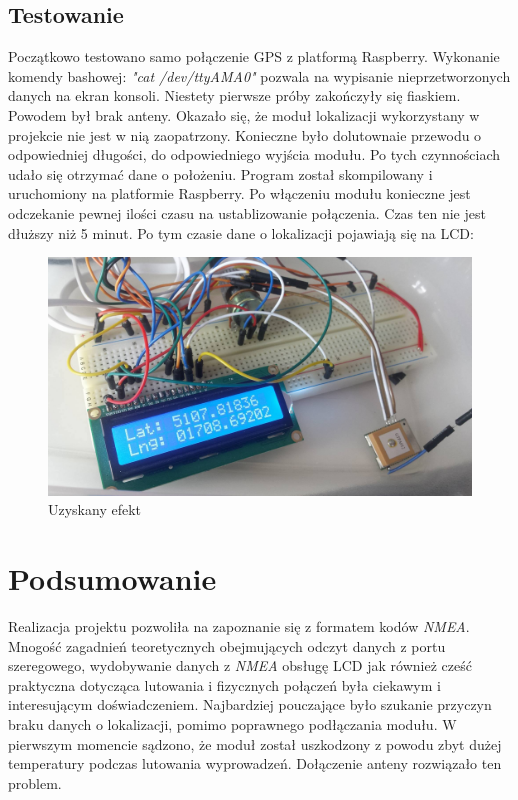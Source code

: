 \documentclass{article}
\begin{document}
	\subsection{Testowanie}	
	Początkowo testowano samo połączenie GPS z platformą Raspberry. Wykonanie komendy bashowej:
	\textit{"cat /dev/ttyAMA0"}
	pozwala na wypisanie nieprzetworzonych danych na ekran konsoli. Niestety pierwsze próby zakończyły się fiaskiem. Powodem był brak anteny. Okazało się, że moduł lokalizacji wykorzystany w projekcie nie jest w nią zaopatrzony. Konieczne było dolutownaie przewodu o odpowiedniej długości, do odpowiedniego wyjścia modułu. Po tych czynnościach udało się otrzymać dane o położeniu.
	Program został skompilowany i uruchomiony na platformie Raspberry. Po włączeniu modułu konieczne jest odczekanie pewnej ilości czasu na ustablizowanie połączenia. Czas ten nie jest dłuższy niż 5 minut. Po tym czasie dane o lokalizacji pojawiają się na LCD:
	
		\begin{figure}[H]
		\centering
		\includegraphics[width=0.9\linewidth]{efekt1.jpg}
		\caption{Uzyskany efekt}
		\end{figure}
\section{Podsumowanie}
	Realizacja projektu pozwoliła na zapoznanie się z formatem kodów \textit{NMEA}. Mnogość zagadnień teoretycznych obejmujących odczyt danych z portu szeregowego, wydobywanie danych z \textit{NMEA} obsługę LCD jak również cześć praktyczna dotycząca lutowania i fizycznych połączeń była ciekawym i interesującym doświadczeniem. Najbardziej pouczające było szukanie przyczyn braku danych o lokalizacji, pomimo poprawnego podłączania modułu. W pierwszym momencie sądzono, że moduł został uszkodzony z powodu zbyt dużej temperatury podczas lutowania wyprowadzeń. Dołączenie anteny rozwiązało ten problem.
\end{document}
